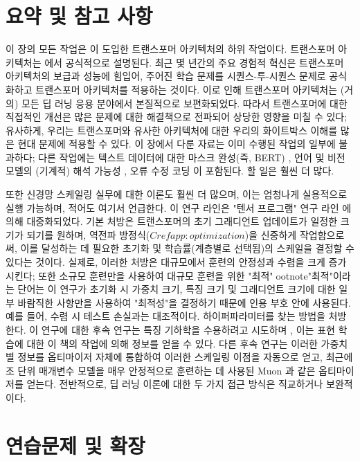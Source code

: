 \documentclass[../../book-main_ko.tex]{subfiles}
\begin{document}
\section{요약 및 참고 사항}

이 장의 모든 작업은 \citet{vaswani2017attention}이 도입한 트랜스포머 아키텍처의 하위 작업이다. 트랜스포머 아키텍처는 에서 공식적으로 설명된다. 최근 몇 년간의 주요 경험적 혁신은 트랜스포머 아키텍처의 보급과 성능에 힘입어, 주어진 학습 문제를 시퀀스-투-시퀀스 문제로 공식화하고 트랜스포머 아키텍처를 적용하는 것이다. 이로 인해 트랜스포머 아키텍처는 (거의) 모든 딥 러닝 응용 분야에서 본질적으로 보편화되었다. 따라서 트랜스포머에 대한 직접적인 개선은 많은 문제에 대한 해결책으로 전파되어 상당한 영향을 미칠 수 있다; 유사하게, 우리는 트랜스포머와 유사한 아키텍처에 대한 우리의 화이트박스 이해를 많은 현대 문제에 적용할 수 있다. 이 장에서 다룬 자료는 이미 수행된 작업의 일부에 불과하다; 다른 작업에는 텍스트 데이터에 대한 마스크 완성(즉, BERT) \citep{devlin2019bert,yu2024white}, 언어 및 비전 모델의 (기계적) 해석 가능성 \citep{bai2024improving}, 오류 수정 코딩 \citep{zheng2025white}이 포함된다. 할 일은 훨씬 더 많다.

또한 신경망 스케일링 실무에 대한 이론도 훨씬 더 많으며, 이는 엄청나게 실용적으로 실행 가능하며, 적어도 여기서 언급한다. 이 연구 라인은 "텐서 프로그램" 연구 라인 \citep{yang2022tensor}에 의해 대중화되었다. 기본 처방은 트랜스포머의 초기 그래디언트 업데이트가 일정한 크기가 되기를 원하며, 역전파 방정식(\(Cref{app:optimization}\))을 신중하게 작업함으로써, 이를 달성하는 데 필요한 초기화 및 학습률(계층별로 선택됨)의 스케일을 결정할 수 있다는 것이다. 실제로, 이러한 처방은 대규모에서 훈련의 안정성과 수렴을 크게 증가시킨다; 또한 소규모 훈련만을 사용하여 대규모 훈련을 위한 "최적"ootnote{"최적"이라는 단어는 이 연구가 초기화 시 가중치 크기, 특징 크기 및 그래디언트 크기에 대한 일부 바람직한 사항만을 사용하여 "최적성"을 결정하기 때문에 인용 부호 안에 사용된다. 예를 들어, 수렴 시 테스트 손실과는 대조적이다.} 하이퍼파라미터를 찾는 방법을 처방한다. 이 연구에 대한 후속 연구는 특징 기하학을 수용하려고 시도하며 \citep{bernstein2024oldoptimizernewnorm}, 이는 표현 학습에 대한 이 책의 작업에 의해 정보를 얻을 수 있다. 다른 후속 연구는 이러한 가중치별 정보를 옵티마이저 자체에 통합하여 이러한 스케일링 이점을 자동으로 얻고, 최근에 조 단위 매개변수 모델을 매우 안정적으로 훈련하는 데 사용된 Muon \citep{jordan6muon}과 같은 옵티마이저를 얻는다. 전반적으로, 딥 러닝 이론에 대한 두 가지 접근 방식은 직교하거나 보완적이다.

\section{연습문제 및 확장}
\end{document}

